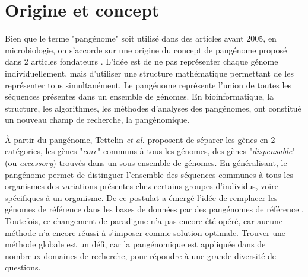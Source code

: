 \section{Origine et concept}

Bien que le terme "pangénome" soit utilisé dans des articles avant 2005, en microbiologie, on s'accorde sur une origine du concept de pangénome proposé dans 2 articles fondateurs \cite{medini_microbial_2005,tettelin_genome_2005}.
L'idée est de ne pas représenter chaque génome individuellement, mais d'utiliser une structure mathématique permettant de les représenter tous simultanément.
Le pangénome représente l'union de toutes les séquences présentes dans un ensemble de génomes. En bioinformatique, la structure, les algorithmes, les méthodes d'analyses des pangénomes, ont constitué un nouveau champ de recherche, la pangénomique.


À partir du pangénome, Tettelin \textit{et al.} proposent de séparer les gènes en 2 catégories, les gènes "\textit{core}" communs à tous les génomes, des gènes "\textit{dispensable}" (ou \textit{accessory}) trouvés dans un sous-ensemble de génomes. En généralisant, le pangénome permet de distinguer l'ensemble des séquences communes à tous les organismes des variations présentes chez certains groupes d'individus, voire spécifiques à un organisme. De ce postulat a émergé l'idée de remplacer les génomes de référence dans les bases de données par des pangénomes de référence \cite{the_computational_pan-genomics_consortium_computational_2018}. Toutefois, ce changement de paradigme n'a pas encore été opéré, car aucune méthode n'a encore réussi à s'imposer comme solution optimale. Trouver une méthode globale est un défi, car la pangénomique est appliquée dans de nombreux domaines de recherche, pour répondre à une grande diversité de questions.


